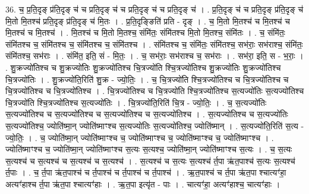 \documentclass[17pt]{extarticle}
\begin{document}
36. च॒ प्र॒ति॒दृङ् प्र॑ति॒दृङ् च॑ च प्रति॒दृङ् च॑ च प्रति॒दृङ् च॑ च प्रति॒दृङ् च॑ । . प्र॒ति॒दृङ् च॑ च प्रति॒दृङ् प्र॑ति॒दृङ् च॑ मि॒तो मि॒तश्च॑ प्रति॒दृङ् प्र॑ति॒दृङ् च॑ मि॒तः । . प्र॒ति॒दृङ्ङिति॑ प्रति - दृङ् । . च॒ मि॒तो मि॒तश्च॑ च मि॒तश्च॑ च मि॒तश्च॑ च मि॒तश्च॑ । . मि॒तश्च॑ च मि॒तो मि॒तश्च॒ संमि॑तः॒ संमि॑तश्च मि॒तो मि॒तश्च॒ संमि॑तः । . च॒ संमि॑तः॒ संमि॑तश्च च॒ संमि॑तश्च च॒ संमि॑तश्च च॒ संमि॑तश्च । . संमि॑तश्च च॒ संमि॑तः॒ संमि॑तश्च॒ सभ॑राः॒ सभ॑राश्च॒ संमि॑तः॒ संमि॑तश्च॒ सभ॑राः । . संमि॑त॒ इति॒ सं - मि॒तः॒ । . च॒ सभ॑राः॒ सभ॑राश्च च॒ सभ॑राः । . सभ॑रा॒ इति॒ स - भ॒राः॒ । . शु॒क्रज्यो॑तिश्च च शु॒क्रज्यो॑तिः शु॒क्रज्यो॑तिश्च चि॒त्रज्यो॑ति श्चि॒त्रज्यो॑तिश्च शु॒क्रज्यो॑तिः शु॒क्रज्यो॑तिश्च चि॒त्रज्यो॑तिः । . शु॒क्रज्यो॑ति॒रिति॑ शु॒क्र - ज्यो॒तिः॒ । . च॒ चि॒त्रज्यो॑ति श्चि॒त्रज्यो॑तिश्च च चि॒त्रज्यो॑तिश्च च चि॒त्रज्यो॑तिश्च च चि॒त्रज्यो॑तिश्च । . चि॒त्रज्यो॑तिश्च च चि॒त्रज्यो॑ति श्चि॒त्रज्यो॑तिश्च स॒त्यज्यो॑तिः स॒त्यज्यो॑तिश्च चि॒त्रज्यो॑ति श्चि॒त्रज्यो॑तिश्च स॒त्यज्यो॑तिः । . चि॒त्रज्यो॑ति॒रिति॑ चि॒त्र - ज्यो॒तिः॒ । . च॒ स॒त्यज्यो॑तिः स॒त्यज्यो॑तिश्च च स॒त्यज्यो॑तिश्च च स॒त्यज्यो॑तिश्च च स॒त्यज्यो॑तिश्च । . स॒त्यज्यो॑तिश्च च स॒त्यज्यो॑तिः स॒त्यज्यो॑तिश्च॒ ज्योति॑ष्मा॒न् ज्योति॑ष्माꣳश्च स॒त्यज्यो॑तिः स॒त्यज्यो॑तिश्च॒ ज्योति॑ष्मान् । . स॒त्यज्यो॑ति॒रिति॑ स॒त्य - ज्यो॒तिः॒ । . च॒ ज्योति॑ष्मा॒न् ज्योति॑ष्माꣳश्च च॒ ज्योति॑ष्माꣳश्च च॒ ज्योति॑ष्माꣳश्च च॒ ज्योति॑ष्माꣳश्च । . ज्योति॑ष्माꣳश्च च॒ ज्योति॑ष्मा॒न् ज्योति॑ष्माꣳश्च स॒त्यः स॒त्यश्च॒ ज्योति॑ष्मा॒न् ज्योति॑ष्माꣳश्च स॒त्यः । . च॒ स॒त्यः स॒त्यश्च॑ च स॒त्यश्च॑ च स॒त्यश्च॑ च स॒त्यश्च॑ । . स॒त्यश्च॑ च स॒त्यः स॒त्यश्च॑ र्त॒पा ऋ॑त॒पाश्च॑ स॒त्यः स॒त्यश्च॑ र्त॒पाः । . च॒ र्त॒पा ऋ॑त॒पाश्च॑ च र्त॒पाश्च॑ च र्त॒पाश्च॑ च र्त॒पाश्च॑ । . ऋ॒त॒पाश्च॑ च र्त॒पा ऋ॑त॒पा श्चात्यꣳ॑हा॒ अत्यꣳ॑हाश्च र्त॒पा ऋ॑त॒पा श्चात्यꣳ॑हाः । . ऋ॒त॒पा इत्यृ॑त - पाः । . चात्यꣳ॑हा॒ अत्यꣳ॑हाश्च॒ चात्यꣳ॑हाः । \newline
\pagebreak
{}
\end{document}
